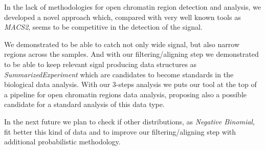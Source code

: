 In the lack of methodologies for open chromatin region detection and analysis, we developed a novel approach which, compared with very well known tools as \textit{MACS2}, seems to be competitive in the detection of the signal.

We demonstrated to be able to catch not only wide signal, but also narrow regions across the samples. 
And with our filtering/aligning step we  demonstrated to be able to keep relevant signl producing data structures as \textit{SummarizedExperiment} which are candidates to become standards in the biological data analysis.
With our 3-steps analysis we puts our tool at the top of a pipeline for open chromatin regions data analysis, proposing also a possible candidate for a standard analysis of this data type.

In the next future we plan to check if other distributions, as \textit{Negative Binomial}, fit better this kind of data and to improve our filtering/aligning step with additional probabilistic methodology.

